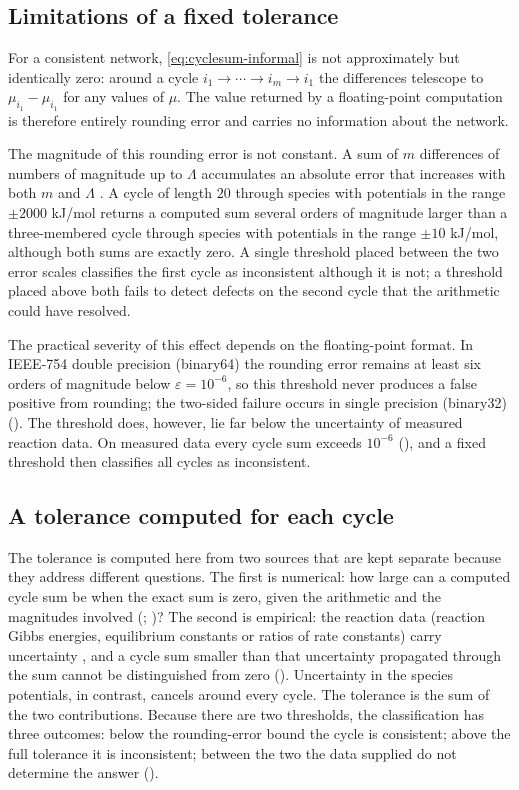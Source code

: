 \documentclass[11pt,a4paper]{article}
\theoremstyle{pstyle}
\theoremstyle{definition}
\theoremstyle{remark}
\newcommand{\eps}{\varepsilon}
\begin{document}
\subsection{Limitations of a fixed tolerance}

For a consistent network, \eqref{eq:cyclesum-informal} is not
approximately but identically zero: around a cycle
$i_1\to\cdots\to i_m\to i_1$ the differences telescope to
$\mu_{i_1}-\mu_{i_1}$ for any values of $\mu$. The value returned by a
floating-point computation is therefore entirely rounding error and
carries no information about the network.

The magnitude of this rounding error is not constant. A sum of $m$
differences of numbers of magnitude up to $\Lambda$ accumulates an
absolute error that increases with both $m$ and $\Lambda$
\citep{higham2002,goldberg1991}. A cycle of length $20$ through species
with potentials in the range $\pm 2000$ kJ/mol returns a computed sum
several orders of magnitude larger than a three-membered cycle through
species with potentials in the range $\pm 10$ kJ/mol, although both sums
are exactly zero. A single threshold placed between the two error
scales classifies the first cycle as inconsistent although it is not; a
threshold placed above both fails to detect defects on the second cycle
that the arithmetic could have resolved.

The practical severity of this effect depends on the floating-point
format. In IEEE-754 double precision (binary64) the rounding error
remains at least six orders of magnitude below $\eps=10^{-6}$, so this
threshold never produces a false positive from rounding; the two-sided
failure occurs in single precision (binary32)
(). The threshold does, however, lie far
below the uncertainty of measured reaction data. On measured data every
cycle sum exceeds $10^{-6}$ (), and a fixed threshold
then classifies all cycles as inconsistent.

\subsection{A tolerance computed for each cycle}

The tolerance is computed here from two sources that are kept separate
because they address different questions. The first is numerical: how
large can a computed cycle sum be when the exact sum is zero, given the
arithmetic and the magnitudes involved
(; \citealp{higham2002})? The second is
empirical: the reaction data (reaction Gibbs energies, equilibrium
constants or ratios of rate constants) carry uncertainty
\citep{alberty1998,noor2013,flamholz2012}, and a cycle sum smaller than
that uncertainty propagated through the sum cannot be distinguished from
zero (). Uncertainty in the species potentials, in
contrast, cancels around every cycle. The tolerance is the sum of the
two contributions. Because there are two thresholds, the classification
has three outcomes: below the rounding-error bound the cycle is
consistent; above the full tolerance it is inconsistent; between the two
the data supplied do not determine the answer ().
\end{document}
